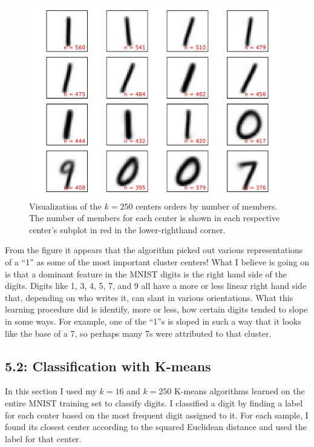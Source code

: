 \documentclass[12pt]{amsart}
\begin{document}
\begin{figure}[H]
	\includegraphics[width=\columnwidth]{k_250_means.pdf}
    \caption{Visualization of the $k = 250$ centers orders by number of members.  The number of members for each center is shown in each respective center's subplot in red in the lower-righthand corner.}
    \label{fig:k_250_means}
\end{figure}

From the figure it appears that the algorithm picked out various representations of a ``1'' as some of the most important cluster centers!  What I believe is going on is that a dominant feature in the MNIST digits is the right hand side of the digits.  Digits like 1, 3, 4, 5, 7, and 9 all have a more or less linear right hand side that, depending on who writes it, can slant in various orientations.  What this learning procedure did is identify, more or less, how certain digits tended to slope in some ways.  For example, one of the ``1''s is sloped in such a way that it looks like the base of a 7, so perhaps many 7s were attributed to that cluster.

\subsection*{5.2: Classification with K-means}

In this section I used my $k = 16$ and $k = 250$ K-means algorithms learned on the entire MNIST training set to classify digits.  I classified a digit by finding a label for each center based on the most frequent digit assigned to it.  For each sample, I found its closest center according to the squared Euclidean distance and used the label for that center.
\end{document}
